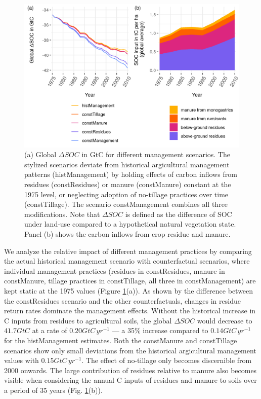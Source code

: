\documentclass[gc, manuscript]{copernicus}
\begin{document}
\begin{figure}[h]
\includegraphics[width=14cm]{../ResultNotebooks/Output/Images/scenario_horiz} \caption{(a) Global $\Delta SOC$ in GtC for different management scenarios. The stylized scenarios deviate from historical argicultural management patterns (histManagement) by holding effects of carbon inflows from residues (constResidues) or manure (constManure) constant at the 1975 level, or neglecting adoption of no-tillage practices over time (constTillage). The scenario constManagement combines all three modifications. Note that $\Delta SOC$ is defined as the difference of SOC under land-use compared to a hypothetical natural vegetation state. Panel (b) shows the carbon inflows from crop residue and manure.}\label{fig:SOCscen}
\end{figure}

We analyze the relative impact of different management practices by comparing the actual historical management scenario with counterfactual scenarios, where individual management practices (residues in constResidues, manure in constManure, tillage practices in constTillage, all three in constManagement) are kept static at the 1975 values (Figure \ref{fig:SOCscen}(a)). As shown by the difference between the constResidues scenario and the other counterfactuals, changes in residue return rates dominate the management effects. Without the historical increase in C inputs from residues to agricultural soils, the global \(\Delta SOC\) would decrease to \(41.7\unit{GtC}\) at a rate of \(0.20\unit{GtC\,yr^{-1}}\) --- a 35\% increase compared to \(0.14\unit{GtC\,yr^{-1}}\) for the histManagement estimates. Both the constManure and constTillage scenarios show only small deviations from the historical argicultural management values with \(0.15\unit{GtC\,yr^{-1}}\). The effect of no-tillage only becomes discernible from 2000 onwards.
The large contribution of residues relative to manure also becomes visible when considering the annual C inputs of residues and manure to soils over a period of 35 years (Fig. \ref{fig:SOCscen}(b)).
\end{document}
